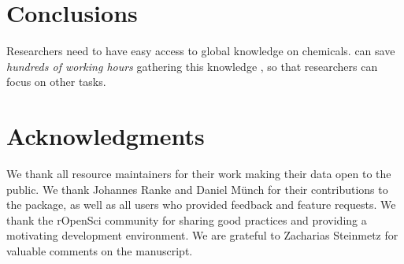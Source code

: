 \documentclass[article]{jss}
\begin{document}
\section[Conclusions]{Conclusions}
Researchers need to have easy access to global knowledge on chemicals.
 can save \emph{hundreds of working hours} gathering
this knowledge \citep{Munch_Galizia_2016}, so that researchers can
focus on other tasks.


\section*{Acknowledgments}
We thank all resource maintainers for their work making their data
open to the public.  We thank Johannes Ranke and Daniel M{\"u}nch for
their contributions to the  package, as well as all users who
provided feedback and feature requests.  We thank the rOpenSci community for sharing good practices and providing a motivating development environment. We are grateful to Zacharias Steinmetz for valuable comments on the manuscript. 



\end{document}
